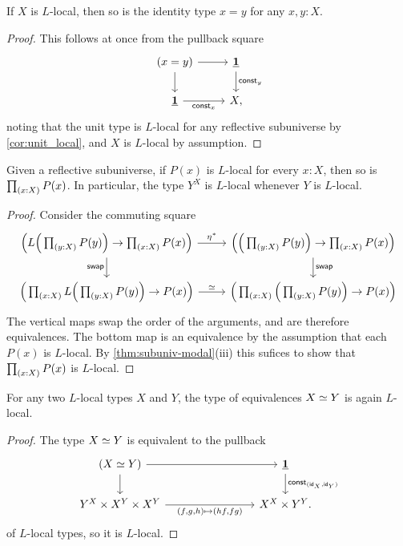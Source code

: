 \begin{cor}\label{lem:rs_idstable}
If $X$ is $L$-local, then so is the identity type $x=y$ for any $x,y:X$.
\end{cor}

\begin{proof}
This follows at once from the pullback square
\begin{equation*}
\begin{tikzcd}
(x=y) \arrow[d] \arrow[r] & \unit \arrow[d,"\mathsf{const}_y"] \\
\unit \arrow[r,swap,"\mathsf{const}_x"] & X,
\end{tikzcd}
\end{equation*}
noting that the unit type is $L$-local for any reflective subuniverse by \cref{cor:unit_local}, and $X$ is $L$-local by assumption.
\end{proof}

\begin{prp}\label{lem:modal-Pi}
Given a reflective subuniverse,
if $P(x)$ is $L$-local for every $x:X$, then so is $\prd{x:X}P(x)$. In particular, the type $Y^X$ is $L$-local whenever $Y$ is $L$-local.
\end{prp}

\begin{proof}
Consider the commuting square
\begin{equation*}
\begin{tikzcd}
\Big(L\Big(\prd{y:X}P(y)\Big)\to \prd{x:X}P(x)\Big) \arrow[r,"\precomp{\modalunit}"] \arrow[d,swap,"\mathsf{swap}"] & \Big(\Big(\prd{y:X}P(y)\Big)\to \prd{x:X}P(x)\Big) \arrow[d,"\mathsf{swap}"] \\
\Big(\prd{x:X} L\Big(\prd{y:X}P(y)\Big)\to P(x)\Big) \arrow[r,"\eqvsym"] & \Big(\prd{x:X}\Big(\prd{y:X}P(y)\Big)\to P(x)\Big)
\end{tikzcd}
\end{equation*}
The vertical maps swap the order of the arguments, and are therefore equivalences. The bottom map is an equivalence by the assumption that each $P(x)$ is $L$-local. By \cref{thm:subuniv-modal}(iii) this sufices to show that $\prd{x:X}P(x)$ is $L$-local.
\end{proof}

\begin{cor}\label{cor:local_equiv}
For any two $L$-local types $X$ and $Y$, the type of equivalences $\eqv{X}{Y}$ is again $L$-local.
\end{cor}

\begin{proof}
The type $\eqv{X}{Y}$ is equivalent to the pullback
  \[
    \begin{tikzcd}[column sep=8em]
      (\eqv{X}{Y}) \arrow[r] \arrow[d] & \unit \arrow[d,"\mathsf{const}_{(\idfunc[X],\idfunc[Y])}"] \\
      Y^X\times X^Y\times X^Y
         \arrow[r,swap,"{(f,g,h) \mapsto (hf,fg)}"] & X^X\times Y^Y.
    \end{tikzcd}
  \]
  of $L$-local types, so it is $L$-local.
\end{proof}

